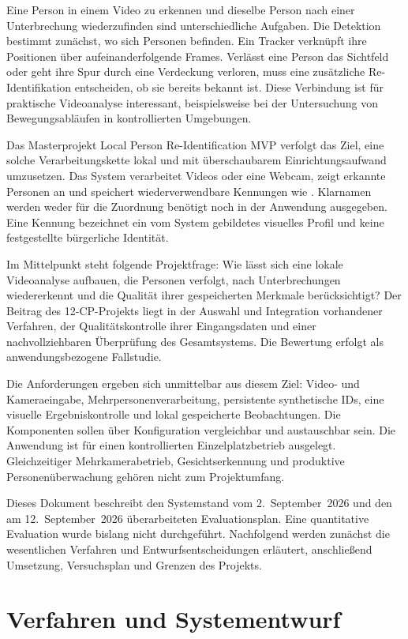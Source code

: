 \documentclass[runningheads]{llncs}
\newcommand{\systemname}{Local Person Re-Identification MVP}
\begin{document}
Eine Person in einem Video zu erkennen und dieselbe Person nach einer Unterbrechung wiederzufinden sind unterschiedliche Aufgaben. Die Detektion bestimmt zunächst, wo sich Personen befinden. Ein Tracker verknüpft ihre Positionen über aufeinanderfolgende Frames. Verlässt eine Person das Sichtfeld oder geht ihre Spur durch eine Verdeckung verloren, muss eine zusätzliche Re-Identifikation entscheiden, ob sie bereits bekannt ist. Diese Verbindung ist für praktische Videoanalyse interessant, beispielsweise bei der Untersuchung von Bewegungsabläufen in kontrollierten Umgebungen.

Das Masterprojekt \systemname{} verfolgt das Ziel, eine solche Verarbeitungskette lokal und mit überschaubarem Einrichtungsaufwand umzusetzen. Das System verarbeitet Videos oder eine Webcam, zeigt erkannte Personen an und speichert wiederverwendbare Kennungen wie . Klarnamen werden weder für die Zuordnung benötigt noch in der Anwendung ausgegeben. Eine Kennung bezeichnet ein vom System gebildetes visuelles Profil und keine festgestellte bürgerliche Identität.

Im Mittelpunkt steht folgende Projektfrage: Wie lässt sich eine lokale Videoanalyse aufbauen, die Personen verfolgt, nach Unterbrechungen wiedererkennt und die Qualität ihrer gespeicherten Merkmale berücksichtigt? Der Beitrag des 12-CP-Projekts liegt in der Auswahl und Integration vorhandener Verfahren, der Qualitätskontrolle ihrer Eingangsdaten und einer nachvollziehbaren Überprüfung des Gesamtsystems. Die Bewertung erfolgt als anwendungsbezogene Fallstudie.

Die Anforderungen ergeben sich unmittelbar aus diesem Ziel: Video- und Kameraeingabe, Mehrpersonenverarbeitung, persistente synthetische IDs, eine visuelle Ergebniskontrolle und lokal gespeicherte Beobachtungen. Die Komponenten sollen über Konfiguration vergleichbar und austauschbar sein. Die Anwendung ist für einen kontrollierten Einzelplatzbetrieb ausgelegt. Gleichzeitiger Mehrkamerabetrieb, Gesichtserkennung und produktive Personenüberwachung gehören nicht zum Projektumfang.

Dieses Dokument beschreibt den Systemstand vom 2.~September~2026 und den am 12.~September~2026 überarbeiteten Evaluationsplan. Eine quantitative Evaluation wurde bislang nicht durchgeführt. Nachfolgend werden zunächst die wesentlichen Verfahren und Entwurfsentscheidungen erläutert, anschlie{\ss}end Umsetzung, Versuchsplan und Grenzen des Projekts.

\section{Verfahren und Systementwurf}
\label{sec:design}
\end{document}
